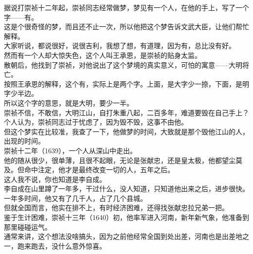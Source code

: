 \begin{multicols}{\theparacolNo}
据说打崇祯十二年起，崇祯同志经常做梦，梦见有一个人，在他的手上，写了一个字——有。\\

这是个很奇怪的梦，而且还不止一次，所以他把这个梦告诉文武大臣，让他们帮忙解释。\\

大家听说，都说很好，说很吉利，我想了想，有道理，因为有，总比没有好。\\

然而有一个人却大惊失色，这个人叫王承恩，是崇祯的贴身太监。\\

散朝后，他找到了崇祯，对他说出了这个梦境的真实意义，可怕的寓意——大明将亡。\\

按照王承恩的解释，这个有，实际上是两个字。上面，是大字少一捺，下面，是明字少半边。\\

所以这个字的意思，就是大明，要少一半。\\

崇祯不信，不敢信，大明江山，自打朱重八起，二百多年，难道要毁在自己手上？\\

个人认为，崇祯同志过于忧虑了，因为毁不毁，这事不由他。\\

但这个梦实在比较准，我查了一下，他做梦的时间，大致就是那个毁他江山的人，出现的时间。\\

崇祯十二年（1639），一个人从深山中走出。\\

他的随从很少，很单薄，且很不起眼，无论是张献忠，还是皇太极，他都望尘莫及。但命中注定，他才是最终改变一切的人，五年之后。\\

这人我不说，你也知道是李自成。\\

李自成在山里蹲了一年多，干过什么，没人知道，只知道他出来之后，进步很快。\\

一年多时间，他又有了几千人，占了几个县城。\\

但就全国而言，他实在排不上，有时经济困难，还得找张献忠拉兄弟一把。\\

鉴于生计困难，崇祯十三年（1640）初，他率军进入河南，新年新气象，他准备到那里碰碰运气。\\

通常来讲，这个想法没啥搞头，因为之前他经常全国到处出差，河南也是出差地之一，跑来跑去，没什么意外惊喜。\\


\end{multicols}
